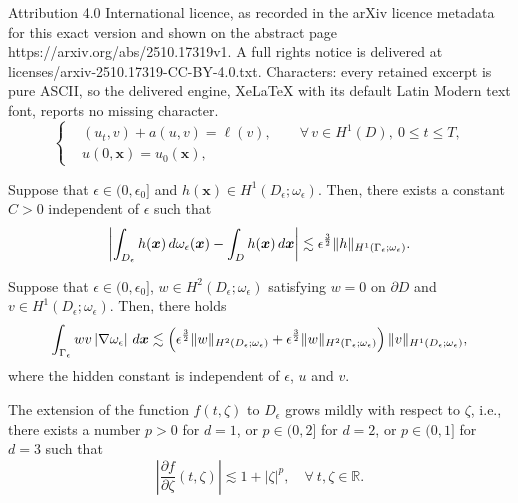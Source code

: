 \documentclass[10pt,a4paper]{amsart}
\newcommand{\dd}{\,{\rm d}}
\begin{document}
Attribution 4.0 International licence, as recorded in the arXiv licence metadata for this exact version and shown on the abstract page https://arxiv.org/abs/2510.17319v1. A full rights notice is delivered at licenses/arxiv-2510.17319-CC-BY-4.0.txt. Characters: every retained excerpt is pure ASCII, so the delivered engine, XeLaTeX with its default Latin Modern text font, reports no missing character.
\begin{equation}
	\label{eq2-2}
	\left\{\begin{split}
		&(u_t,v)+a(u,v)=\ell(v), \qquad \forall \,v \in H^1(D),\ 0 \leq t \leq T,\\
		&u(0,\bm x)=u_0(\bm x),
	\end{split}
	\right.
\end{equation}

\begin{theorem}
	\label{thm1}
	Suppose that $\epsilon\in (0, \epsilon_0]$ and  $h(\bm x) \in H^1(D_{\epsilon};\omega_{\epsilon})$. Then, there exists a constant $C>0$ independent of $\epsilon$ such that
	\begin{equation*}
		\left|\int_{D_{\epsilon}} h(\bm x)\dd \omega_{\epsilon}(\bm x)-\int_D h(\bm x)\dd \bm x \right| \lesssim \epsilon^{\frac 3 2}\|h\|_{H^1(\Gamma_{\epsilon};\omega_{\epsilon})}.
	\end{equation*}
\end{theorem}

\begin{theorem}
	\label{thm2}
	Suppose that  $\epsilon\in (0, \epsilon_0]$, $w \in H^2(D_{\epsilon};\omega_{\epsilon})$ satisfying $w=0$ on $\partial D$ and  $v \in H^1(D_{\epsilon};\omega_{\epsilon})$. Then, there holds
	\begin{equation*}
		\int_{\Gamma_{\epsilon}} wv\left|\nabla \omega_{\epsilon}\right|\dd \bm x \lesssim \left(\epsilon^{\frac 3 2}\|w\|_{H^2(D_{\epsilon};\omega_{\epsilon})}+\epsilon^{\frac 3 2}\|w\|_{H^2(\Gamma_{\epsilon};\omega_{\epsilon})}\right)\|v\|_{H^1(D_{\epsilon};\omega_{\epsilon})},
	\end{equation*}
	where the hidden constant is independent of $\epsilon$, $u$ and $v$.
\end{theorem}

\begin{assumption}
	\label{mild_growth}
	The extension of the function $f(t,\zeta)$ to $D_{\epsilon}$ grows mildly with respect to $\zeta$, i.e., there exists a number $p>0$ for $d=1$, or $p\in (0, 2]$ for $d=2$, or $p\in (0,1]$ for $d=3$ such that
	\begin{equation}
		\label{mild_growth_eq}
		\left|\frac{\partial f}{\partial \zeta}(t,\zeta)\right|\lesssim 1+|\zeta|^p,\quad \forall\ t, \zeta \in \mathbb{R}.
	\end{equation}
\end{assumption}
\end{document}
